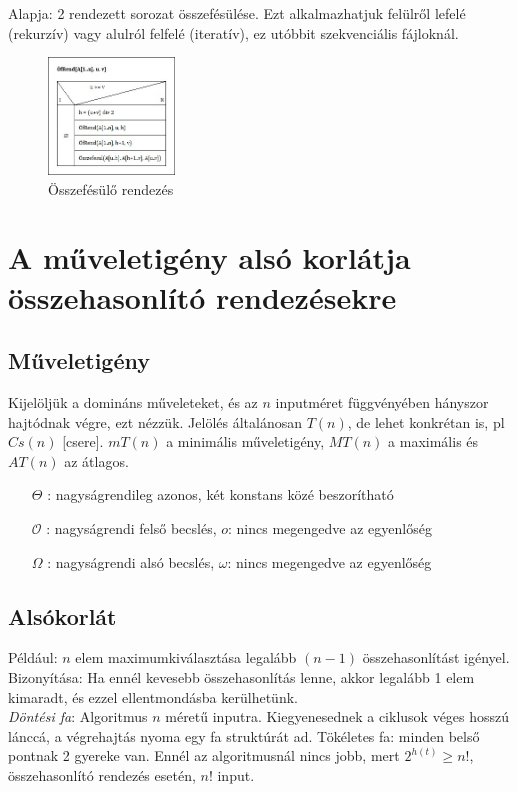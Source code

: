 \documentclass[margin=0px]{article}
\begin{document}
	Alapja: 2 rendezett sorozat összefésülése. Ezt alkalmazhatjuk felülről lefelé (rekurzív) vagy alulról felfelé (iteratív), ez utóbbit szekvenciális fájloknál.
	\begin{figure}[H]
		\centering
		\includegraphics[width=0.3\textwidth]{img/OFRend.jpg}
		\caption{Összefésülő rendezés}
	\end{figure}
	
	\section{A műveletigény alsó korlátja összehasonlító rendezésekre}
	
	\subsection{Műveletigény}
	
	Kijelöljük a domináns műveleteket, és az $n$ inputméret függvényében hányszor hajtódnak végre, ezt nézzük. Jelölés általánosan $T(n)$, de lehet konkrétan is, pl $Cs(n)$ [csere]. $mT(n)$ a minimális műveletigény, $MT(n)$ a maximális és $AT(n)$ az átlagos.	
	\begin{itemize}
		\item[$\Theta$]: nagyságrendileg azonos, két konstans közé beszorítható
		\item[$\mathcal{O}$]: nagyságrendi felső becslés, $o$: nincs megengedve az egyenlőség
		\item[$\Omega$]: nagyságrendi alsó becslés, $\omega$: nincs megengedve az egyenlőség
	\end{itemize}
	
	\subsection{Alsókorlát}
	
	Például: $n$ elem maximumkiválasztása legalább $(n-1)$ összehasonlítást igényel. Bizonyítása: Ha ennél kevesebb összehasonlítás lenne, akkor legalább 1 elem kimaradt, és ezzel ellentmondásba kerülhetünk. \\
	\textit{Döntési fa}: Algoritmus $n$ méretű inputra. Kiegyenesednek a ciklusok véges hosszú lánccá, a végrehajtás nyoma egy fa struktúrát ad. Tökéletes fa: minden belső pontnak 2 gyereke van. Ennél az algoritmusnál nincs jobb, mert $2^{h(t)} \geq n!$, összehasonlító rendezés esetén, $n!$ input.
	
\end{document}
